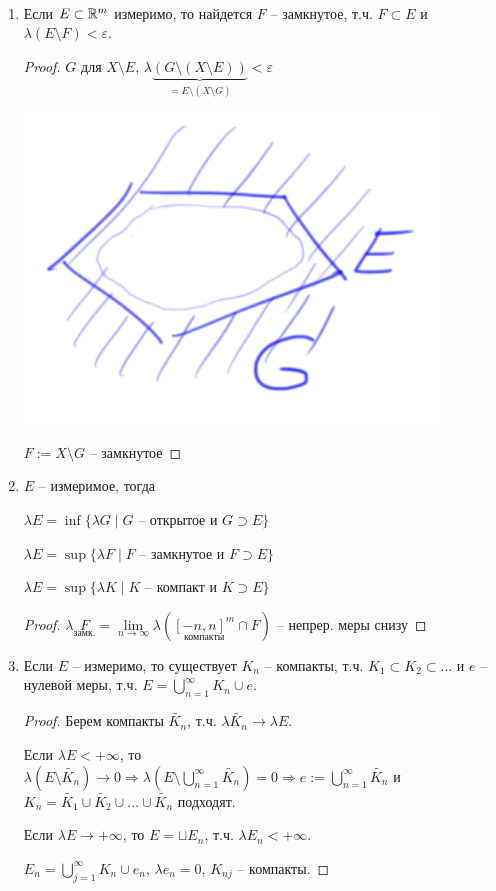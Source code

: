\begin{corollary}~
    \begin{enumerate}
        \item Если $E\subset \mathbb{R}^m$ измеримо, то найдется $F$ – замкнутое, т.ч. 
        $F\subset E$ и $\lambda (E\setminus F)< \varepsilon$.

        \begin{proof}
            $G$ для $X\setminus E$, $\lambda \underbrace{(G\setminus (X\setminus E))}_{=E\setminus (X\setminus G)}< \varepsilon$

            \includegraphics[width=0.2\linewidth]{images/23-09-21-5.png}

            $F:= X\setminus G$ – замкнутое
        \end{proof}

        \item $E$ – измеримое, тогда 
        
        $\lambda E =\inf \{\lambda G\mid G\text{ – открытое и } G\supset E\}$

        $\lambda E = \sup \{\lambda F\mid F\text{ – замкнутое и } F\supset E\}$

        $\lambda E = \sup \{\lambda K\mid K\text{ – компакт и } K\supset E\}$

        \begin{proof}
            $\lambda \underset{\text{замк.}}{F}=\lim\limits_{n\rightarrow \infty} \lambda (\underset{\text{компакты}}{[-n, n]^m} \cap F)$ – непрер. меры снизу
        \end{proof}
        
        \item Если $E$ – измеримо, то существует $K_n$ – компакты, т.ч. $K_1 \subset K_2 \subset ...$ и $e$ – нулевой
        меры, т.ч. $E=\bigcup\limits_{n=1}^\infty K_n\cup e$.

        \begin{proof}
            Берем компакты $\tilde{K_n}$, т.ч. $\lambda\tilde{K_n} \rightarrow \lambda E$.

            Если $\lambda E<+\infty $, то $\lambda (E\setminus \tilde{K_n})\rightarrow 0\Rightarrow \lambda (E\setminus \bigcup\limits_{n=1}^\infty \tilde{K_n}) = 0
            \Rightarrow e:=\bigcup\limits_{n=1}^\infty \tilde{K_n}$ и $K_n=\tilde{K_1}\cup \tilde{K_2}\cup ... \cup \tilde{K_n}$ подходят.

            Если $\lambda E\rightarrow +\infty $, то $E=\sqcup E_n$, т.ч. $\lambda E_n < +\infty$.

            $E_n=\bigcup\limits_{j=1}^\infty K_n\cup e_n$, $\lambda e_n = 0$, $K_{nj}$ – компакты.
        \end{proof}
    \end{enumerate}
\end{corollary}

